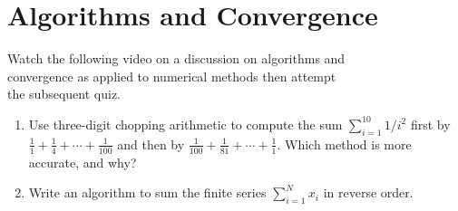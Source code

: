 \section{Algorithms and Convergence}
\begin{youtube}[]
Watch the following video on  a discussion on algorithms and \\convergence as applied to numerical methods then attempt\\ the subsequent quiz.\\
\end{youtube}
\begin{myexercise}\label{Comprehensionquiz2}
\begin{enumerate}[label=(\alph*)]
\item Use three-digit chopping arithmetic to compute the sum $\sum_{i=1}^{10} 1 / i^{2}$ first by $\frac{1}{1}+\frac{1}{4}+\cdots+\frac{1}{100}$ and then by $\frac{1}{100}+\frac{1}{81}+\cdots+\frac{1}{1}$. Which method is more accurate, and why?
\item Write an algorithm to sum the finite series $\sum^N_{i=1}x_i$ in reverse order.
\end{enumerate}



\end{myexercise}
